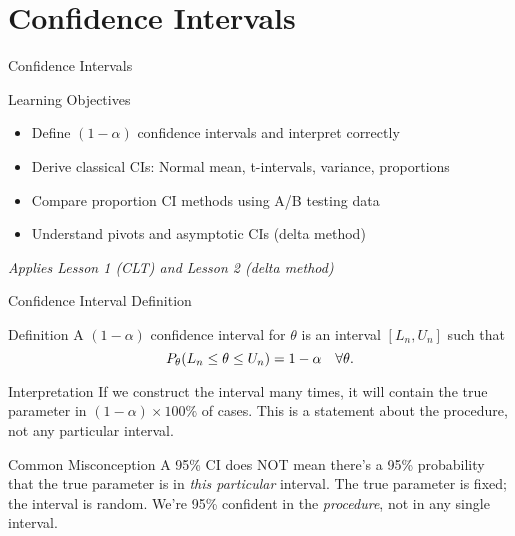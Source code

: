 
\section{Confidence Intervals}

\begin{frame}{Confidence Intervals}
  \begin{block}{Learning Objectives}
    \begin{itemize}
      \item Define $(1-\alpha)$ confidence intervals and interpret correctly
      \item Derive classical CIs: Normal mean, t-intervals, variance, proportions
      \item Compare proportion CI methods using A/B testing data
      \item Understand pivots and asymptotic CIs (delta method)
    \end{itemize}
  \end{block}

  \vspace{1em}
  \begin{center}
    \textit{Applies Lesson 1 (CLT) and Lesson 2 (delta method)}
  \end{center}
\end{frame}

\begin{frame}{Confidence Interval Definition}
  \begin{block}{Definition}
    A $(1-\alpha)$ confidence interval for $\theta$ is an interval $[L_n, U_n]$ such that
    \[\P_{\theta}(L_n \leq \theta \leq U_n) = 1-\alpha \quad \forall \theta.\]
  \end{block}

  \begin{block}{Interpretation}
    If we construct the interval many times, it will contain the true
    parameter in $(1-\alpha) \times 100\%$ of cases. This is a statement
    about the procedure, not any particular interval.
  \end{block}

  \begin{block}{Common Misconception}
    A 95\% CI does NOT mean there's a 95\% probability that the true
    parameter is in \textit{this particular} interval. The true parameter
    is fixed; the interval is random. We're 95\% confident in the
    \textit{procedure}, not in any single interval.
  \end{block}
\end{frame}

